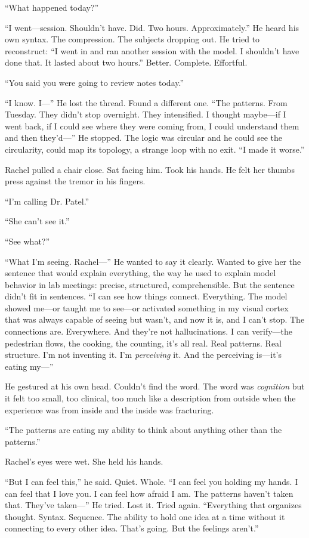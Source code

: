 ``What happened today?''

``I went---session. Shouldn't have. Did. Two hours. Approximately.'' He heard his own syntax. The compression. The subjects dropping out. He tried to reconstruct: ``I went in and ran another session with the model. I shouldn't have done that. It lasted about two hours.'' Better. Complete. Effortful.

``You said you were going to review notes today.''

``I know. I---'' He lost the thread. Found a different one. ``The patterns. From Tuesday. They didn't stop overnight. They intensified. I thought maybe---if I went back, if I could see where they were coming from, I could understand them and then they'd---'' He stopped. The logic was circular and he could see the circularity, could map its topology, a strange loop with no exit. ``I made it worse.''

Rachel pulled a chair close. Sat facing him. Took his hands. He felt her thumbs press against the tremor in his fingers.

``I'm calling Dr. Patel.''

``She can't see it.''

``See what?''

``What I'm seeing. Rachel---'' He wanted to say it clearly. Wanted to give her the sentence that would explain everything, the way he used to explain model behavior in lab meetings: precise, structured, comprehensible. But the sentence didn't fit in sentences. ``I can see how things connect. Everything. The model showed me---or taught me to see---or activated something in my visual cortex that was always capable of seeing but wasn't, and now it is, and I can't stop. The connections are. Everywhere. And they're not hallucinations. I can verify---the pedestrian flows, the cooking, the counting, it's all real. Real patterns. Real structure. I'm not inventing it. I'm \textit{perceiving} it. And the perceiving is---it's eating my---''

He gestured at his own head. Couldn't find the word. The word was \textit{cognition} but it felt too small, too clinical, too much like a description from outside when the experience was from inside and the inside was fracturing.

``The patterns are eating my ability to think about anything other than the patterns.''

Rachel's eyes were wet. She held his hands.

``But I can feel this,'' he said. Quiet. Whole. ``I can feel you holding my hands. I can feel that I love you. I can feel how afraid I am. The patterns haven't taken that. They've taken---'' He tried. Lost it. Tried again. ``Everything that organizes thought. Syntax. Sequence. The ability to hold one idea at a time without it connecting to every other idea. That's going. But the feelings aren't.''

